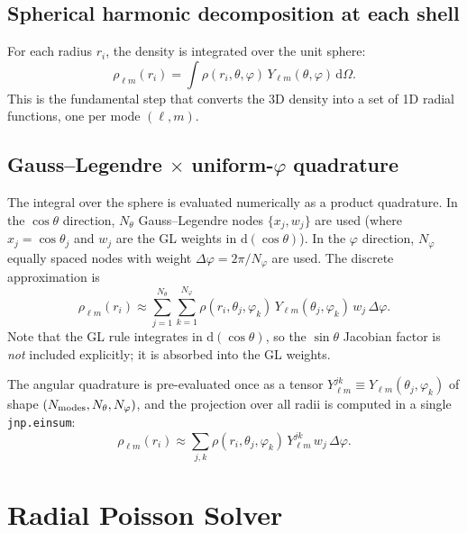 \documentclass[11pt]{article}
\begin{document}
\subsection{Spherical harmonic decomposition at each shell}

For each radius $r_i$, the density is integrated over the unit sphere:
\begin{equation}
  \rho_{\ell m}(r_i) = \int \rho(r_i,\theta,\varphi)\, Y_{\ell m}(\theta,\varphi)\,
  \mathrm{d}\Omega.
\end{equation}
This is the fundamental step that converts the 3D density into a set of 1D
radial functions, one per mode $(\ell,m)$.

\subsection{Gauss--Legendre $\times$ uniform-$\varphi$ quadrature}

The integral over the sphere is evaluated numerically as a product quadrature.
In the $\cos\theta$ direction, $N_\theta$ Gauss--Legendre nodes $\{x_j,
w_j\}$ are used (where $x_j = \cos\theta_j$ and $w_j$ are the GL weights in
$\mathrm{d}(\cos\theta)$).  In the $\varphi$ direction, $N_\varphi$ equally
spaced nodes with weight $\Delta\varphi = 2\pi/N_\varphi$ are used.  The
discrete approximation is
\begin{equation}
  \rho_{\ell m}(r_i) \approx \sum_{j=1}^{N_\theta} \sum_{k=1}^{N_\varphi}
    \rho(r_i, \theta_j, \varphi_k)\, Y_{\ell m}(\theta_j, \varphi_k)\,
    w_j\, \Delta\varphi.
\end{equation}
Note that the GL rule integrates in $\mathrm{d}(\cos\theta)$, so the
$\sin\theta$ Jacobian factor is \emph{not} included explicitly; it is
absorbed into the GL weights.

The angular quadrature is pre-evaluated once as a tensor
$Y_{\ell m}^{jk} \equiv Y_{\ell m}(\theta_j,\varphi_k)$ of shape
$(N_{\rm modes}, N_\theta, N_\varphi)$, and the projection over all radii is
computed in a single \texttt{jnp.einsum}:
\begin{equation}
  \rho_{\ell m}(r_i) \approx \sum_{j,k} \rho(r_i,\theta_j,\varphi_k)\,
  Y_{\ell m}^{jk}\, w_j\, \Delta\varphi.
\end{equation}



\section{Radial Poisson Solver}
\end{document}
